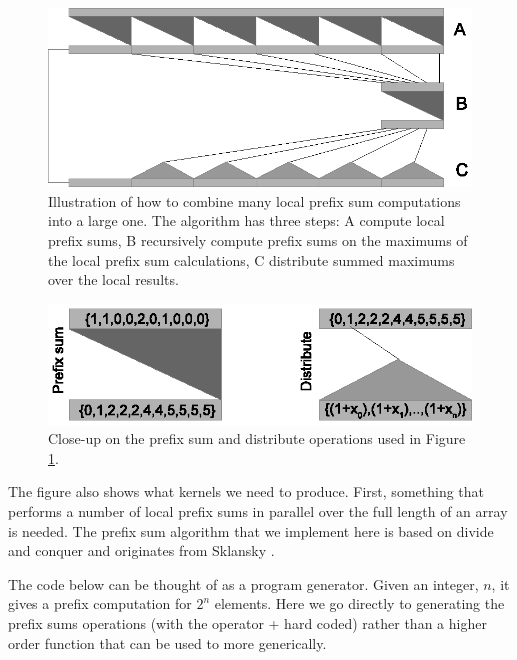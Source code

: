 \begin{figure}
\includegraphics[width=\linewidth]{./csort/prefixsum}
\caption{Illustration of how to combine many local prefix sum computations 
 into a large one. The algorithm has three steps: A compute local prefix sums, 
 B recursively compute prefix sums on the maximums of the local prefix sum 
 calculations, C distribute summed maximums over the local results.}
\label{fig:prefixsum}
\end{figure}

\begin{figure} 
\begin{center}
\includegraphics[width=\linewidth]{./csort/prefixzoom}
\caption{Close-up on the prefix sum and distribute operations used in Figure \ref{fig:prefixsum}.} 
\label{fig:prefixzoom}
\end{center}
\end{figure}

The figure also shows what kernels we need to produce. First, something that 
performs a number of local prefix sums in parallel over the full length 
of an array is needed. The prefix sum algorithm that we implement here is 
based on divide and conquer and originates from Sklansky . 

The code below can be thought of as a program generator. Given an integer, $n$,
it gives a prefix computation for $2^n$ elements. Here we go directly to 
generating the prefix sums operations (with the operator + hard coded) rather 
than a higher order function that can be used to more generically.

